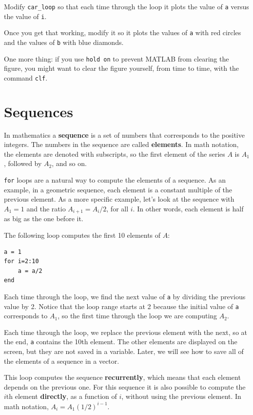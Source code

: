 \documentclass[
]{book}
\begin{document}
\begin{ex}
Modify {\tt car\_loop} so that each time through the
loop it plots the value of {\tt a} versus the value of {\tt i}.

Once you get that working, modify it so it plots the values of {\tt a}
with red circles and the values of {\tt b} with blue diamonds.

One more thing: if you use {\tt hold on} to prevent MATLAB from
clearing the figure, you might want to clear the figure yourself,
from time to time, with the command {\tt clf}.
\end{ex}


\section{Sequences}

In mathematics a {\bf sequence} is a set of numbers that corresponds
to the positive integers.  The numbers in the sequence are
called {\bf elements}.  In math notation, the elements
are denoted with subscripts, so the first element of the series $A$ is
$A_1$, followed by $A_2$, and so on.

{\tt for} loops are a natural way to compute the elements of a sequence.
As an example, in a geometric sequence, each element is a constant
multiple of the previous element.  As a more specific example, let's
look at the sequence with $A_1 = 1$ and the ratio $A_{i+1} = A_i/2$,
for all $i$.  In other words, each element is half as big as the one
before it.

The following loop computes the first 10 elements of $A$:

\begin{verbatim}
a = 1
for i=2:10
    a = a/2
end
\end{verbatim}

Each time through the loop, we find the next value of {\tt a}
by dividing the previous value by 2.  Notice that the loop
range starts at 2 because the initial value of {\tt a} corresponds
to $A_1$, so the first time through the loop we are computing
$A_2$.

Each time through the loop, we replace the previous element with
the next, so at the end, {\tt a} contains the 10th element.  The
other elements are displayed on the screen, but they are not saved
in a variable.  Later, we will see how to save all of the elements
of a sequence in a vector.

This loop computes the sequence {\bf recurrently}, which means
that each element depends on the previous one.
For this sequence it is also possible to compute the $i$th element
{\bf directly}, as a function of $i$, without using the previous element.
In math notation, $A_i = A_1 (1/2)^{i-1}$. %
\end{document}
